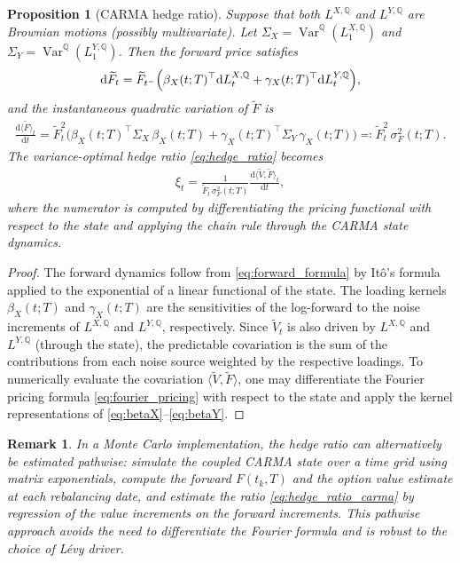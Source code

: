 \documentclass[10pt,reqno]{amsart}
\newtheorem{proposition}[theorem]{Proposition}
\newtheorem{remark}[theorem]{Remark}
\newcommand{\Q}{\mathbb{Q}}
\newcommand{\1}{\mathbbm{1}}
\newcommand{\dd}{\mathrm{d}}
\DeclareMathOperator{\Var}{Var}
\begin{document}
\begin{proposition}[CARMA hedge ratio]
\label{prop:carma_hedge_ratio}
Suppose that both $L^{X,\Q}$ and $L^{Y,\Q}$ are Brownian motions (possibly
multivariate). Let $\Sigma_X = \Var^\Q(L_1^{X,\Q})$ and
$\Sigma_Y = \Var^\Q(L_1^{Y,\Q})$. Then the forward price satisfies
$$
\dd \widetilde{F}_t
= \widetilde{F}_{t^-}\Bigl(
    \beta_X(t;T)^\top \dd L_t^{X,\Q}
    + \gamma_X(t;T)^\top \dd L_t^{Y,\Q}
  \Bigr),
$$
and the instantaneous quadratic variation of $\widetilde{F}$ is
\begin{align}\label{eq:forward_qv}
  \frac{\dd \langle \widetilde{F} \rangle_t}{\dd t}
  = \widetilde{F}_t^2 \bigl(
      \beta_X(t;T)^\top \Sigma_X\, \beta_X(t;T)
      + \gamma_X(t;T)^\top \Sigma_Y\, \gamma_X(t;T)
    \bigr) \eqqcolon \widetilde{F}_t^2\, \sigma_F^2(t;T).
\end{align}
The variance-optimal hedge ratio \eqref{eq:hedge_ratio} becomes
\begin{align}\label{eq:hedge_ratio_carma}
  \xi_t
  = \frac{1}{\widetilde{F}_t\, \sigma_F^2(t;T)}
    \frac{\dd \langle \widetilde{V}, \widetilde{F} \rangle_t}{\dd t},
\end{align}
where the numerator is computed by differentiating the pricing functional with
respect to the state and applying the chain rule through the CARMA state
dynamics.
\end{proposition}

\begin{proof}
The forward dynamics follow from \eqref{eq:forward_formula} by It\^o's formula
applied to the exponential of a linear functional of the state. The loading
kernels $\beta_X(t;T)$ and $\gamma_X(t;T)$ are the sensitivities of the
log-forward to the noise increments of $L^{X,\Q}$ and
$L^{Y,\Q}$, respectively. Since $\widetilde{V}_t$ is also driven by
$L^{X,\Q}$ and $L^{Y,\Q}$ (through the state), the predictable covariation
is the sum of the contributions from each noise source weighted by the
respective loadings. To numerically evaluate the covariation
$\langle\widetilde{V},\widetilde{F}\rangle$, one may differentiate the Fourier
pricing formula \eqref{eq:fourier_pricing} with respect to the state and apply
the kernel representations of \eqref{eq:betaX}--\eqref{eq:betaY}.
\end{proof}

\begin{remark}
In a Monte Carlo implementation, the hedge ratio can alternatively be
estimated pathwise: simulate the coupled CARMA state over a time grid using
matrix exponentials, compute the forward $F(t_k,T)$ and the option value
estimate at each rebalancing date, and estimate the ratio
\eqref{eq:hedge_ratio_carma} by regression of the value increments on the
forward increments. This pathwise approach avoids the need to differentiate
the Fourier formula and is robust to the choice of Lévy driver.
\end{remark}
\end{document}
